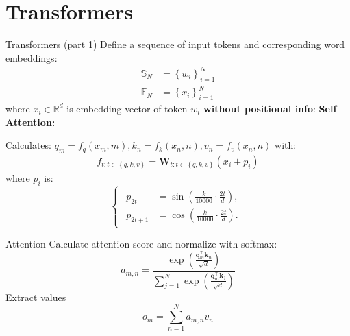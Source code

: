 \documentclass{beamer}
\begin{document}
\section{Transformers}
\begin{frame}[t]{Transformers (part 1)}
    Define a sequence of input tokens and corresponding word embeddings:
    \begin{align*}
    \mathbb{S}_N &= \left\{w_i \right\}_{i=1}^N\\
    \mathbb{E}_N &= \left\{x_i \right\}_{i=1}^N
    \end{align*}
    where $x_i \in \mathbb{R}^d$ is embedding vector of token $w_i$ \textbf{without positional info}:
    \newline
    \textbf{Self Attention:}

    Calculates: $q_m = f_q(x_m, m), k_n = f_k(x_n, n), v_n = f_v(x_n, n)$ with:
    \begin{gather}\label{eq:4}
        f_{t:t\in \left\{q,k,v\right\}} = \textbf{W}_{t:t\in \left\{q,k,v\right\}}(x_i + p_i)
    \end{gather}
    where $p_i$ is:
    \[
        \begin{cases}
        \begin{aligned}
        p_{2t} & = \sin\left(\frac{k}{10000} \cdot \frac{2t}{d}\right), \\
        p_{2t+1} & = \cos\left(\frac{k}{10000} \cdot \frac{2t}{d}\right).
        \end{aligned}
        \end{cases}
    \]
\end{frame}

\begin{frame}[t]{Attention}
    Calculate attention score and normalize with softmax: %
    \[
        a_{m,n} =
        \frac{\exp\left(\frac{\mathbf{q}_m^\top \mathbf{k}_n}{\sqrt{d}}\right)}
        {\sum_{j=1}^N \exp\left(\frac{\mathbf{q}_m^\top \mathbf{k}_j}{\sqrt{d}}\right)}
    \]
    Extract values 
    \[o_m = \sum_{n=1}^N a_{m,n} v_n \]
\end{frame}
\end{document}
